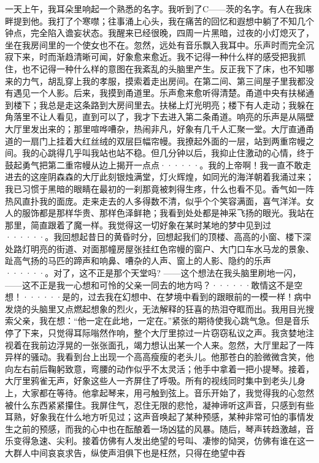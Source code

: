 \documentclass[12pt, UTF8]{ctexbook}
\begin{document}
\par 一天上午，我耳朵里响起一个熟悉的名字。我听到了C——茨的名字。有人在我床畔提到他。我打了个寒噤；往事涌上心头，我在痛苦的回忆和遐想中躺了不知几个钟点，完全陷入谵妄状态。我醒来已经很晚，四周一片黑暗，过夜的小灯熄灭了，坐在我房间里的一个使女也不在。忽然，远处有音乐飘入我耳中。乐声时而完全沉寂下来，时而渐趋清晰可闻，好象愈来愈近。我不记得一种什么样的感受把我抓住，也不记得一种什么样的意图在我紊乱的头脑里产生。反正我下了床，也不知哪来的力气，胡乱穿上我的孝服，摸索着走出房间。在第二间、第三间屋子里我都没有遇见一个人影。后来，我摸到甬道里。乐声愈来愈听得清楚。甬道中央有扶梯通到楼下；我总是走这条路到大房间里去。扶梯上灯光明亮；楼下有人走动；我躲在角落里不让人看见，直到可以了，我才下去进入第二条甬道。响亮的乐声是从隔壁大厅里发出来的；那里喧哗嘈杂，热闹非凡，好象有几千人汇聚一堂。大厅直通甬道的一扇门上挂着大红丝绒的双层巨幅帘幔。我撩起外面的一层，站到两重帘幔之间。我的心跳得几乎叫我站也站不稳。但几分钟以后，我抑止住激动的心情，终于鼓起勇气把第二重帘幔从边上揭开一点点······。我的上帝啊！我一直不敢走进去的这座阴森森的大厅此刻银烛满堂，灯火辉煌，如同光的海洋朝着我涌过来；我已习惯于黑暗的眼睛在最初的一刹那竟被刺得生疼，什么也看不见。香气如一阵热风直扑我的面庞。走来走去的人多得数不清，似乎个个笑容满面，喜气洋洋。女人的服饰都是那样华贵、那样色泽鲜艳；我看到处处都是神采飞扬的眼光。我站在那里，简直跟着了魔一样。我觉得这一切好象在某时某地的梦中见到过······。我回想起昔日的黄昏时分，回想起我们的顶楼、高高的小窗、楼下深处路灯明亮的街道、对面那幢房屋张挂红色帘幔的窗户、大门口车水马龙的景象、趾高气扬的马匹的蹄声和响鼻、嘈杂的人声、窗上的人影、隐约的乐声······。对了，这不正是那个天堂吗? ——这个想法在我头脑里刷地一闪，——这不正是我一心想和可怜的父亲一同去的地方吗？······敢情这不是空想！······是的，过去我在幻想中、在梦境中看到的跟眼前的一模一样！病中发烧的头脑里又点燃起想象的烈火，无法解释的狂喜的热泪夺眶而出。我用目光搜索父亲，我在想：“他一定在此地，一定在。”紧张的期待使我心跳气急。但是音乐停了下来，只觉得耳际嗡然作响，整个大厅里掠过一片窃窃私议之声。我贪婪地注视着在我前边浮晃的一张张面孔，竭力想认出某一个人来。忽然，大厅里起了一阵异样的骚动。我看到台上出现一个高高瘦瘦的老头儿。他那苍白的脸微微含笑，他向左右前后鞠躬致意，弯腰的动作似乎不太灵活；他手中拿着一把小提琴。接着，大厅里鸦雀无声，好象这些人一齐屏住了呼吸。所有的视线同时集中到老头儿身上，大家都在等待。他拿起琴来，用弓触到弦上。音乐开始了，我觉得我的心忽然被什么东西紧紧攥住。我屏住气，忍住无限的悲怆，凝神谛听这声音，只感到有些耳熟，好象我在什么地方听见过；这声音唤起了某种预感，某种非常可怕的事情发生之前的预感，而我的心中也在酝酿着一场凶猛的风暴。随后，琴声转趋激越，音乐变得急速、尖利。接着仿佛有人发出绝望的号叫、凄惨的恸哭，仿佛有谁在这一大群人中间哀哀求告，纵使声泪俱下也是枉然，只得在绝望中吞
\end{document}
